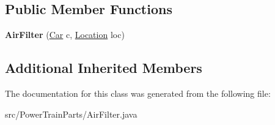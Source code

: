 \subsection*{Public Member Functions}
\begin{DoxyCompactItemize}
\item 
\hypertarget{classPowerTrainParts_1_1AirFilter_ac3620106d37012faf5c985050aa3db35}{}{\bfseries Air\+Filter} (\hyperlink{classCars_1_1Car}{Car} c, \hyperlink{enumEnums_1_1Location}{Location} loc)\label{classPowerTrainParts_1_1AirFilter_ac3620106d37012faf5c985050aa3db35}

\end{DoxyCompactItemize}
\subsection*{Additional Inherited Members}


The documentation for this class was generated from the following file\+:\begin{DoxyCompactItemize}
\item 
src/\+Power\+Train\+Parts/Air\+Filter.\+java\end{DoxyCompactItemize}
